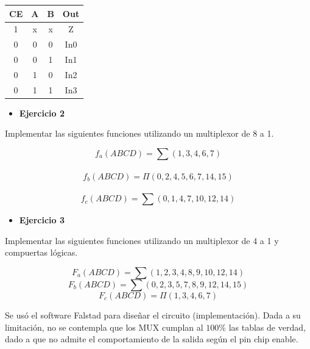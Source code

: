 \begin{center}
\begin{minipage}{0.3\textwidth}
\begin{tabular}{|cccc|}
\multicolumn{1}{|c|}{CE} & \multicolumn{1}{c|}{A} & \multicolumn{1}{c|}{B} & Out \\ \hline
\multicolumn{1}{|c|}{1}  & \multicolumn{1}{c|}{x} & \multicolumn{1}{c|}{x} & Z   \\ \hline
\multicolumn{1}{|c|}{0}  & \multicolumn{1}{c|}{0} & \multicolumn{1}{c|}{0} & In0 \\ \hline
\multicolumn{1}{|c|}{0}  & \multicolumn{1}{c|}{0} & \multicolumn{1}{c|}{1} & In1 \\ \hline
\multicolumn{1}{|c|}{0}  & \multicolumn{1}{c|}{1} & \multicolumn{1}{c|}{0} & In2 \\ \hline
\multicolumn{1}{|c|}{0}  & \multicolumn{1}{c|}{1} & \multicolumn{1}{c|}{1} & In3 \\ \hline
\end{tabular}
    \end{minipage}
\end{center}
\begin{itemize}[nosep]\item \textbf{Ejercicio 2} \end{itemize}
\sangria{} Implementar las siguientes funciones utilizando un multiplexor de 8 a 1.
\begin{center}\Large
    \[ f_a(ABCD) = \sum (1,3,4,6,7)  \] \\
    \[ f_b(ABCD) = \varPi (0,2,4,5,6,7,14,15) \] \\
    \[ f_c(ABCD) = \sum (0,1,4,7,10,12,14 )\]
\end{center}
\begin{itemize}[nosep]\item \textbf{Ejercicio 3} \end{itemize}
\sangria{} Implementar las siguientes funciones utilizando un multiplexor de 4 a 1 y compuertas lógicas.
\begin{center}\Large
    \[ F_a(ABCD) = \sum (1,2,3,4,8,9,10,12,14) \]
    \[ F_b(ABCD) = \sum (0,2,3,5,7,8,9,12,14,15) \]
    \[ F_c(ABCD) = \varPi (1,3,4,6,7) \]
\end{center}
\sangria{} Se usó el software Falstad para diseñar el circuito (implementación). Dada a su limitación, no se contempla que los MUX cumplan al $100\%$ las tablas de verdad, dado a que no admite el comportamiento de la salida según el pin chip enable.
